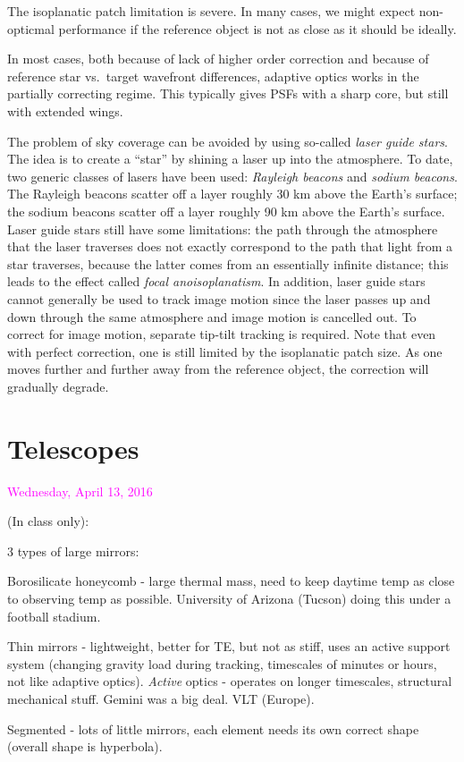 \documentclass[12pt]{article}
\begin{document}
The isoplanatic patch limitation is severe. In many cases, we might
expect non-opticmal performance if the reference object is not as
close as it should be ideally.

In most cases, both because of lack of higher order correction and
because of reference star vs.\ target wavefront differences, adaptive
optics works in the partially correcting regime. This typically gives
PSFs with a sharp core, but still with extended wings.

The problem of sky coverage can be avoided by using so-called \emph{laser
guide stars}. The idea is to create a ``star'' by shining a laser up into
the atmosphere. To date, two generic classes of lasers have been used:
\emph{Rayleigh beacons} and \emph{sodium beacons}.
The Rayleigh beacons scatter off a layer roughly 30 km above the Earth's surface;
the sodium beacons scatter off a layer roughly 90 km above the Earth's surface.
Laser guide stars still have some limitations:
the path through the atmosphere that the laser traverses does not exactly
correspond to the path that light from a star traverses, because the
latter comes from an essentially infinite distance; this leads to the
effect called \emph{focal anoisoplanatism}.
In addition, laser guide stars
cannot generally be used to track image motion since the laser passes
up and down through the same atmosphere and image motion is cancelled
out. To correct for image motion, separate tip-tilt tracking is
required. Note that even with perfect correction, one is still limited
by the isoplanatic patch size. As one moves further and further away
from the reference object, the correction will gradually degrade.

\section*{Telescopes}
\textcolor{magenta}{Wednesday, April 13, 2016}

(In class only):

3 types of large mirrors:
\begin{itemize*}
    \item Borosilicate honeycomb - large thermal mass, need to keep daytime
        temp as close to observing temp as possible. University of Arizona
        (Tucson) doing this under a football stadium.
    \item Thin mirrors - lightweight, better for TE, but not as stiff, uses
        an active support system (changing gravity load during tracking,
        timescales of minutes or hours, not like adaptive optics).
        \emph{Active} optics - operates on longer timescales, structural
        mechanical stuff. Gemini was a big deal. VLT (Europe).
    \item Segmented - lots of little mirrors, each element needs its own correct
        shape (overall shape is hyperbola).
\end{itemize*}
\end{document}
